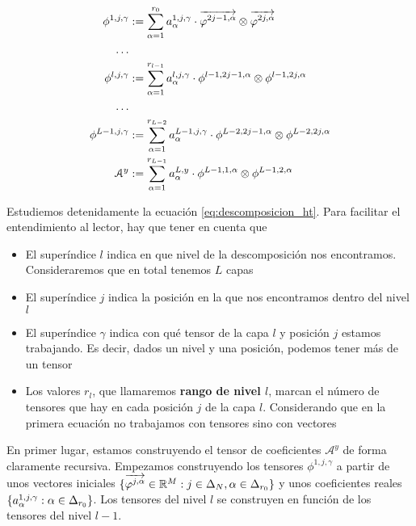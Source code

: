 \begin{equation} \label{eq:descomposicion_ht}
\begin{split}
    \phi^{1, j, \gamma} &:= \sum_{\alpha = 1}^{r_0} a_{\alpha}^{1, j, \gamma} \cdot \overrightarrow{\varphi^{2j-1, \alpha}} \otimes \overrightarrow{\varphi^{2j, \alpha}} \\
    \ldots \\
    \phi^{l, j, \gamma} &:= \sum_{\alpha = 1}^{r_{l-1}} a_{\alpha}^{l, j, \gamma} \cdot \phi^{l-1, 2j-1, \alpha} \otimes \phi^{l-1, 2j, \alpha} \\
    \ldots \\
    \phi^{L - 1, j, \gamma} &:= \sum_{\alpha = 1}^{r_{L-2}} a_{\alpha}^{L - 1, j, \gamma} \cdot \phi^{L-2, 2j-1, \alpha} \otimes \phi^{L-2, 2j, \alpha} \\
    \mathcal{A}^y &:= \sum_{\alpha = 1}^{r_{L-1}} a_{\alpha}^{L, y} \cdot \phi^{L-1, 1, \alpha} \otimes \phi^{L-1, 2, \alpha}
\end{split}
\end{equation}

Estudiemos detenidamente la ecuación \eqref{eq:descomposicion_ht}. Para facilitar el entendimiento al lector, hay que tener en cuenta que

\begin{itemize}
    \item El superíndice $l$ indica en que nivel de la descomposición nos encontramos. Consideraremos que en total tenemos $L$ capas
    \item El superíndice $j$ indica la posición en la que nos encontramos dentro del nivel $l$
    \item El superíndice $\gamma$ indica con qué tensor de la capa $l$ y posición $j$ estamos trabajando. Es decir, dados un nivel y una posición, podemos tener más de un tensor
    \item Los valores $r_l$, que llamaremos \textbf{rango de nivel $l$}, marcan el número de tensores que hay en cada posición $j$ de la capa $l$. Considerando que en la primera ecuación no trabajamos con tensores sino con vectores
\end{itemize}

En primer lugar, estamos construyendo el tensor de coeficientes $\mathcal{A}^y$ de forma claramente recursiva. Empezamos construyendo los tensores $\phi^{1, j, \gamma}$ a partir de unos vectores iniciales $\{\overrightarrow{\varphi^{j, \alpha}} \in \mathbb{R}^M: j \in \Delta_{N}, \alpha \in \Delta_{r_0}  \}$  y unos coeficientes reales $\{a_{\alpha}^{1, j, \gamma}: \alpha \in \Delta_{r_0}\}$. Los tensores del nivel $l$ se construyen en función de los tensores del nivel $l-1$.

